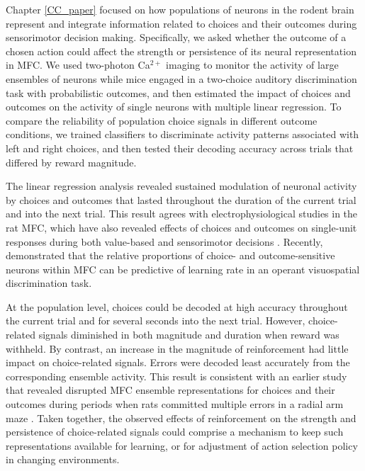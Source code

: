 
\fancyhead[L]{} 



Chapter \ref{CC_paper} focused on how populations of neurons in the rodent brain represent and integrate information related to choices and their outcomes during sensorimotor decision making. Specifically, we asked whether the outcome of a chosen action could affect the strength or persistence of its neural representation in MFC. We used two-photon Ca$^{2+}$ imaging to monitor the activity of large ensembles of neurons while mice engaged in a two-choice auditory discrimination task with probabilistic outcomes, and then estimated the impact of choices and outcomes on the activity of single neurons with multiple linear regression. To compare the reliability of population choice signals in different outcome conditions, we trained classifiers to discriminate activity patterns associated with left and right choices, and then tested their decoding accuracy across trials that differed by reward magnitude.

The linear regression analysis revealed sustained modulation of neuronal activity by choices and outcomes that lasted throughout the duration of the current trial and into the next trial. This result agrees with electrophysiological studies in the rat MFC, which have also revealed effects of choices and outcomes on single-unit responses during both value-based \citep{sul2011role} and sensorimotor decisions \citep{yuan2014cortical,mao2019cortical}. Recently, \cite{mao2019cortical} demonstrated that the relative proportions of choice- and outcome-sensitive neurons within MFC can be predictive of learning rate in an operant visuospatial discrimination task.   

At the population level, choices could be decoded at high accuracy throughout the current trial and for several seconds into the next trial. However, choice-related signals diminished in both magnitude and duration when reward was withheld. By contrast, an increase in the magnitude of reinforcement had little impact on choice-related signals. Errors were decoded least accurately from the corresponding ensemble activity. This result is consistent with an earlier study that revealed disrupted MFC ensemble representations for choices and their outcomes during periods when rats committed multiple errors in a radial arm maze \citep{lapish2008successful, hyman2012action}. Taken together, the observed effects of reinforcement on the strength and persistence of choice-related signals could comprise a mechanism to keep such representations available for learning, or for adjustment of action selection policy in changing environments.


